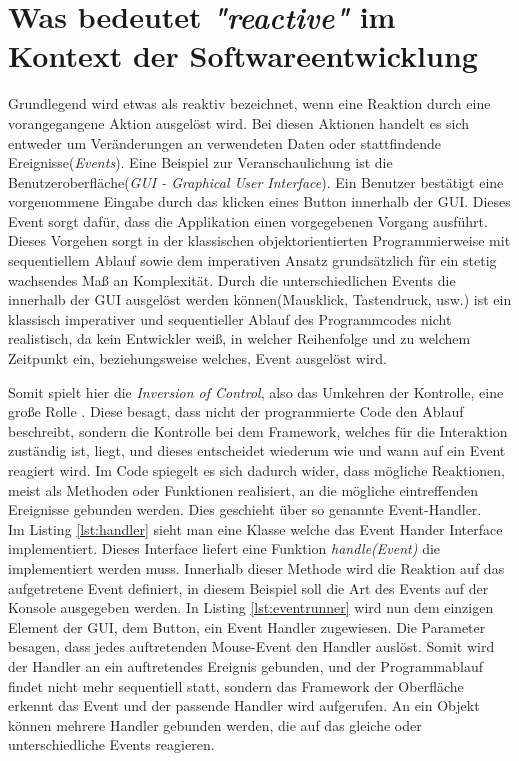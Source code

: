 \chapter{Was bedeutet \textit{"reactive"} im Kontext der Softwareentwicklung}\label{was_ist_reactive_programming}
Grundlegend wird etwas als reaktiv bezeichnet, wenn eine Reaktion durch eine vorangegangene Aktion ausgelöst wird. Bei diesen Aktionen handelt es sich entweder um Veränderungen an verwendeten Daten oder stattfindende Ereignisse(\textit{Events}). Eine Beispiel zur Veranschaulichung ist die Benutzeroberfläche(\textit{GUI - Graphical User Interface}). Ein Benutzer bestätigt eine vorgenommene Eingabe durch das klicken eines Button innerhalb der GUI. Dieses Event sorgt dafür, dass die Applikation einen vorgegebenen Vorgang ausführt. Dieses Vorgehen sorgt in der klassischen objektorientierten Programmierweise mit sequentiellem Ablauf sowie dem imperativen Ansatz grundsätzlich für ein stetig wachsendes Maß an Komplexität. Durch die unterschiedlichen Events die innerhalb der GUI ausgelöst werden können(Mausklick, Tastendruck, usw.) ist ein klassisch imperativer und sequentieller Ablauf des Programmcodes nicht realistisch, da kein Entwickler weiß, in welcher Reihenfolge und zu welchem Zeitpunkt ein, beziehungsweise welches, Event ausgelöst wird.

 Somit spielt hier die \textit{Inversion of Control}, also das Umkehren der Kontrolle, eine große Rolle \cite{MartinFowler.2005}. Diese besagt, dass nicht der programmierte Code den Ablauf beschreibt, sondern die Kontrolle bei dem Framework, welches für die Interaktion zuständig ist, liegt, und dieses entscheidet wiederum wie und wann auf ein Event reagiert wird. Im Code spiegelt es sich dadurch wider, dass mögliche Reaktionen, meist als Methoden oder Funktionen realisiert, an die mögliche eintreffenden Ereignisse gebunden werden. Dies geschieht über so genannte Event-Handler. \\
Im Listing \ref{lst:handler} sieht man eine Klasse welche das Event Hander Interface implementiert. Dieses Interface liefert eine Funktion \textit{handle(Event)} die implementiert werden muss. Innerhalb dieser Methode wird die Reaktion auf das aufgetretene Event definiert, in diesem Beispiel soll die Art des Events auf der Konsole ausgegeben werden. In Listing \ref{lst:eventrunner} wird nun dem einzigen Element der GUI, dem Button, ein Event Handler zugewiesen. Die Parameter besagen, dass jedes auftretenden Mouse-Event den Handler auslöst. Somit wird der Handler an ein auftretendes Ereignis gebunden, und der Programmablauf findet nicht mehr sequentiell statt, sondern das Framework der Oberfläche erkennt das Event und der passende Handler wird aufgerufen. An ein Objekt können mehrere Handler gebunden werden, die auf das gleiche oder unterschiedliche Events reagieren.

